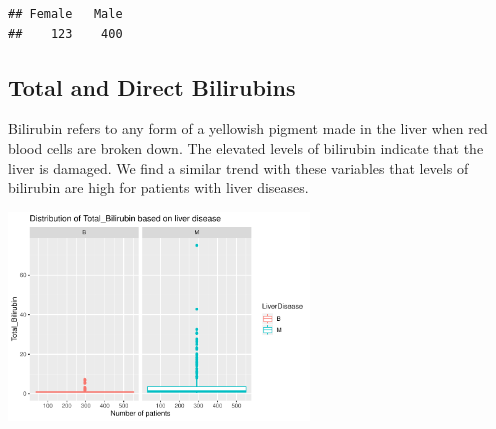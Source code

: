 \documentclass[]{article}
\newenvironment{Shaded}{\begin{snugshade}}{\end{snugshade}}
\newcommand{\CommentTok}[1]{\textcolor[rgb]{0.56,0.35,0.01}{\textit{#1}}}
\newcommand{\DataTypeTok}[1]{\textcolor[rgb]{0.13,0.29,0.53}{#1}}
\newcommand{\KeywordTok}[1]{\textcolor[rgb]{0.13,0.29,0.53}{\textbf{#1}}}
\newcommand{\NormalTok}[1]{#1}
\newcommand{\OperatorTok}[1]{\textcolor[rgb]{0.81,0.36,0.00}{\textbf{#1}}}
\newcommand{\StringTok}[1]{\textcolor[rgb]{0.31,0.60,0.02}{#1}}
\begin{document}
\begin{Shaded}
\end{Shaded}

\begin{verbatim}
## Female   Male 
##    123    400
\end{verbatim}

\subsection{Total and Direct Bilirubins}

Bilirubin refers to any form of a yellowish pigment made in the liver
when red blood cells are broken down. The elevated levels of bilirubin
indicate that the liver is damaged. We find a similar trend with these
variables that levels of bilirubin are high for patients with liver
diseases.

\begin{Shaded}
\end{Shaded}

\begin{center}
\includegraphics[width=0.6\textwidth]{LiverDisease_files/figure-latex/unnamed-chunk-14-1.pdf}
\end{center}
\end{document}
